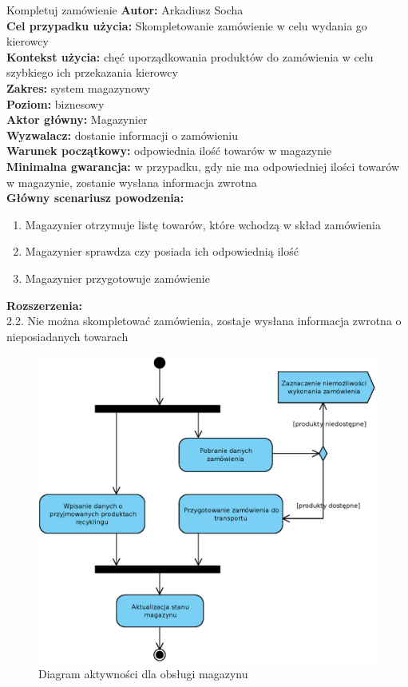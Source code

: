 	\begin{usecase}{Kompletuj zamówienie}
		\textbf{Autor:} Arkadiusz Socha\\
		\textbf{Cel przypadku użycia:} Skompletowanie zamówienie w celu wydania go kierowcy \\
		\textbf{Kontekst użycia:} chęć uporządkowania produktów do zamówienia w celu szybkiego ich przekazania kierowcy \\
		\textbf{Zakres:} system magazynowy \\
		\textbf{Poziom:} biznesowy \\
		\textbf{Aktor główny:} Magazynier \\
		\textbf{Wyzwalacz:} dostanie informacji o zamówieniu \\
		\textbf{Warunek początkowy:} odpowiednia ilość towarów w magazynie \\
		\textbf{Minimalna gwarancja:} w przypadku, gdy nie ma odpowiedniej ilości towarów w magazynie, zostanie wysłana informacja zwrotna  \\
		\textbf{Główny scenariusz powodzenia:} 
			\begin{enumerate}
				\item Magazynier otrzymuje listę towarów, które wchodzą w skład zamówienia
				\item Magazynier sprawdza czy posiada ich odpowiednią ilość
				\item Magazynier przygotowuje zamówienie
			\end{enumerate}
		\textbf{Rozszerzenia:} \\
		2.2. Nie można skompletować zamówienia, zostaje wysłana informacja zwrotna o nieposiadanych towarach\\
	\end{usecase}

	\begin{figure}[H]
		\centering
		\includegraphics[width=.9\textwidth]{img/AD/magazyn.eps}
		\caption{Diagram aktywności dla obsługi magazynu}
	\end{figure}

